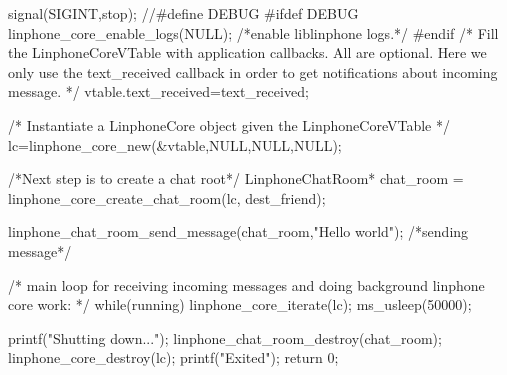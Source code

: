 \begin{DoxyCodeInclude}
{        signal(SIGINT,stop);
//#define DEBUG
#ifdef DEBUG
        linphone_core_enable_logs(NULL); /*enable liblinphone logs.*/
#endif
        /* 
         Fill the LinphoneCoreVTable with application callbacks.
         All are optional. Here we only use the text_received callback
         in order to get notifications about incoming message.
         */
        vtable.text_received=text_received;

        /*
         Instantiate a LinphoneCore object given the LinphoneCoreVTable
        */
        lc=linphone_core_new(&vtable,NULL,NULL,NULL);


        /*Next step is to create a chat root*/
        LinphoneChatRoom* chat_room = linphone_core_create_chat_room(lc,
      dest_friend);

        linphone_chat_room_send_message(chat_room,"Hello world"); /*sending
       message*/

        /* main loop for receiving incoming messages and doing background
       linphone core work: */
        while(running){
                linphone_core_iterate(lc);
                ms_usleep(50000);
        }

        printf("Shutting down...\n");
        linphone_chat_room_destroy(chat_room);
        linphone_core_destroy(lc);
        printf("Exited\n");
        return 0;
}

\end{DoxyCodeInclude}
 